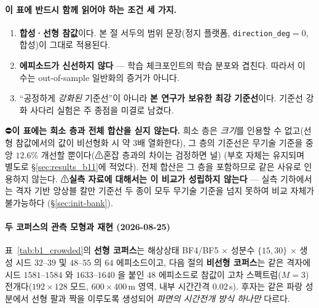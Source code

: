 \documentclass[11pt]{report}
\numberwithin{equation}{chapter}
\numberwithin{figure}{chapter}
\numberwithin{table}{chapter}
\begin{document}
\paragraph{이 표에 반드시 함께 읽어야 하는 조건 세 가지.}
\begin{enumerate}
  \item \textbf{합성·선형 참값}이다. 본 절 서두의 범위 문장(정지 플랫폼,
        \texttt{direction\_deg}$=0$, 합성)이 그대로 적용된다.
  \item \textbf{에피소드가 신선하지 않다} --- 학습 체크포인트의 학습 분포와 겹친다.
        따라서 이 수는 out-of-sample 일반화의 증거가 아니다.
  \item ``공정하게 \emph{강화된} 기준선''이 아니라 \textbf{본 연구가 보유한 최강 기준선}이다.
        기준선 강화 사다리 실험은 주 종점을 미결로 남겼다.
\end{enumerate}
⛔\textbf{이 표에는 희소 층과 전체 합산을 싣지 않는다.}
희소 층은 \emph{크기}를 인용할 수 없고(선형 참값에서의 값이 비선형화 시 약 $3$배 열화한다),
그 층의 기준선은 무기술 기준을 중앙 $12.6\%$ 개선할 뿐이다(⚠혼잡 층과의 차이는 검정하면 널)
(부호 자체는 유지되며 별도로 \S\ref{sec:results_b11}에 적었다). 전체 합산은 그 층을
포함하므로 같은 사유로 인용하지 않는다.
⚠\textbf{실측 자료에 대해서는 이 비교가 성립하지 않는다} --- 실측 기하에서는 격자 기반
앙상블 칼만 기준선 두 종이 모두 무기술 기준을 넘지 못하여 비교 자체가 불가능하다
(\S\ref{sec:init-bank}).

\paragraph{두 코퍼스의 관측 모형과 재현 (2026-08-25)}
표~\ref{tab:b1_crowded}의 \textbf{선형 코퍼스}는 해상상태 BF4/BF5 $\times$ 성분수
$\{15,30\}$ $\times$ 생성 시드 $32$--$39$ 및 $48$--$55$ 의 $64$ 에피소드이고, 다음 절의
\textbf{비선형 코퍼스}는 같은 격자에 시드 $1581$--$1584$ 와 $1633$--$1640$ 을 붙인
$48$ 에피소드로 참값이 고차 스펙트럼($M{=}3$) 전개다($192\times128$ 모드,
$600\times400$\,m 영역, 내부 시간간격 $0.02$\,s). 후자는 같은 파랑 성분에서 선형 팔과
짝을 이루도록 생성되어 \emph{파면의 시간전개 방식 하나만} 다르다.
\end{document}
